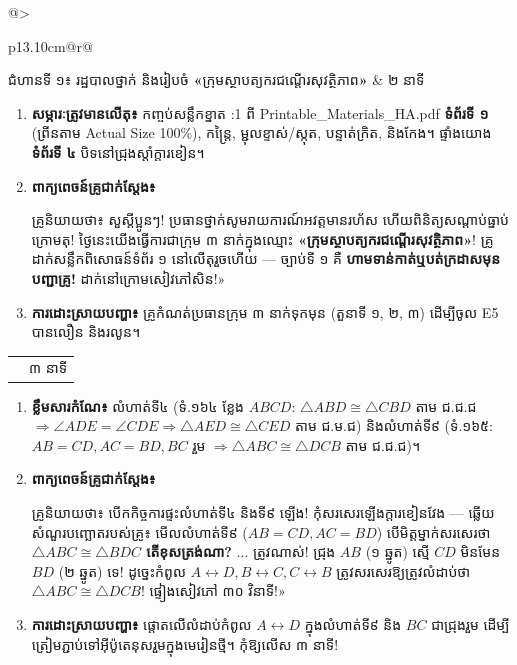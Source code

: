 \documentclass[a4paper,12pt]{article}
\makeatletter
\newcommand{\en}[1]{{\TimesEn #1}}
\newcommand{\enbf}[1]{{\TimesEn\textbf{#1}}}
\newcommand{\tri}[1]{\ensuremath{\triangle #1}}
\newcommand{\ang}[1]{\ensuremath{\angle #1}}
\newcommand{\cg}{\ensuremath{\cong}}
\newenvironment{phasebox}[3]{%
  \par\needspace{2.4cm}%
  \begin{tcolorbox}[
    enhanced, sharp corners, colback=headgray, colframe=black,
    boxrule=1.0pt, top=3.5pt, bottom=3.5pt, left=8pt, right=8pt,
    before skip=5pt, after skip=3pt
  ]
    \linespread{1.0}\selectfont\renewcommand{\arraystretch}{1.0}%
    \begin{tabular*}{\linewidth}{@{}>{\raggedright\arraybackslash}p{13.10cm}@{\extracolsep{\fill}}r@{}}
      {\muol\fontsize{11pt}{14.5pt}\selectfont #1} & {\fontsize{10.5pt}{13.5pt}\selectfont\en{#2 |} #3}%
    \end{tabular*}%
  \end{tcolorbox}%
  \begingroup\fontsize{11.5pt}{14.92pt}\selectfont
}{%
  \par\endgroup
  \vspace{3pt}{\color{black}\hrule height 0.75pt}\vspace{5pt}%
}
\makeatother
\begin{document}
\begin{phasebox}{ជំហានទី ១៖ រដ្ឋបាលថ្នាក់ និងរៀបចំ \enbf{«}ក្រុមស្ថាបត្យករជណ្ដើរសុវត្ថិភាព\enbf{»}}{00--02 min}{២ នាទី}
  \begin{enumerate}[leftmargin=0.45cm, topsep=1.5pt, itemsep=2.2pt, parsep=0pt]
    \item \textbf{សម្ភារៈត្រូវមានលើតុ៖} កញ្ចប់សន្លឹកខ្នាត \en{1:1} ពី \en{Printable\_\allowbreak Materials\_\allowbreak HA.pdf} \textbf{ទំព័រទី ១} (ព្រីនតាម \en{Actual Size 100\%}), កន្ត្រៃ, ម្ជុលខ្ទាស់/ស្កុត, បន្ទាត់ក្រិត, និងកែង។ ផ្ទាំងយោង \textbf{ទំព័រទី ៤} បិទនៅជ្រុងស្ដាំក្ដារខៀន។
    \item \textbf{ពាក្យពេចន៍គ្រូជាក់ស្ដែង៖}
      \begin{scriptbox}
        {\muol\fontsize{10.8pt}{14.5pt}\selectfont \enbf{«}គ្រូនិយាយថា៖} សួស្ដីប្អូនៗ! ប្រធានថ្នាក់សូមរាយការណ៍អវត្តមានរហ័ស ហើយពិនិត្យសណ្ដាប់ធ្នាប់ក្រោមតុ! ថ្ងៃនេះយើងធ្វើការជាក្រុម ៣ នាក់ក្នុងឈ្មោះ \textbf{«ក្រុមស្ថាបត្យករជណ្ដើរសុវត្ថិភាព»}! គ្រូដាក់សន្លឹកពិសោធន៍ទំព័រ ១ នៅលើតុរួចហើយ — ច្បាប់ទី ១ គឺ \textbf{ហាមទាន់កាត់ឬបត់ក្រដាសមុនបញ្ជាគ្រូ!} ដាក់នៅក្រោមសៀវភៅសិន!»
      \end{scriptbox}
    \item \textbf{ការដោះស្រាយបញ្ហា៖} គ្រូកំណត់ប្រធានក្រុម ៣ នាក់ទុកមុន (តួនាទី ១, ២, ៣) ដើម្បីចូល \en{E5} បានលឿន និងរលូន។
  \end{enumerate}
\end{phasebox}

\begin{phasebox}{ជំហានទី ២ \enbf{(}ក\enbf{)}៖ កំណែកិច្ចការផ្ទះមេរៀន \enbf{SSS (\#4, \#9)} \enbf{\&} សំណួរបញ្ឆោត}{02--05 min}{៣ នាទី}
  \begin{enumerate}[leftmargin=0.45cm, topsep=1.5pt, itemsep=2.2pt, parsep=0pt]
    \item \textbf{ខ្លឹមសារកំណែ៖} លំហាត់ទី៤ (ទំ.១៦៤ ខ្លែង $ABCD$: $\tri{ABD}\cg\tri{CBD}$ តាម ជ.ជ.ជ $\Rightarrow \ang{ADE}=\ang{CDE} \Rightarrow \tri{AED}\cg\tri{CED}$ តាម ជ.ម.ជ) និងលំហាត់ទី៩ (ទំ.១៦៥: $AB=CD, AC=BD, BC$ រួម $\Rightarrow \tri{ABC}\cg\tri{DCB}$ តាម ជ.ជ.ជ)។
    \item \textbf{ពាក្យពេចន៍គ្រូជាក់ស្ដែង៖}
      \begin{scriptbox}
        {\muol\fontsize{10.8pt}{14.5pt}\selectfont \enbf{«}គ្រូនិយាយថា៖} បើកកិច្ចការផ្ទះលំហាត់ទី៤ និងទី៩ ឡើង! កុំសរសេរឡើងក្ដារខៀនវែង — ឆ្លើយសំណួរបញ្ឆោតរបស់គ្រូ៖ មើលលំហាត់ទី៩ ($AB=CD, AC=BD$) បើមិត្តម្នាក់សរសេរថា \textbf{$\tri{ABC}\cg\tri{BDC}$ តើខុសត្រង់ណា?} ... ត្រូវណាស់! ជ្រុង $AB$ (១ ឆ្នូត) ស្មើ $CD$ មិនមែន $BD$ (២ ឆ្នូត) ទេ! ដូច្នេះកំពូល $A\leftrightarrow D, B\leftrightarrow C, C\leftrightarrow B$ ត្រូវសរសេរឱ្យត្រូវលំដាប់ថា \textbf{$\tri{ABC}\cg\tri{DCB}$}! ផ្ទៀងសៀវភៅ ៣០ វិនាទី!»
      \end{scriptbox}
    \item \textbf{ការដោះស្រាយបញ្ហា៖} ផ្ដោតលើលំដាប់កំពូល $A\leftrightarrow D$ ក្នុងលំហាត់ទី៩ និង $BC$ ជាជ្រុងរួម ដើម្បីត្រៀមភ្ជាប់ទៅអ៊ីប៉ូតេនុសរួមក្នុងមេរៀនថ្មី។ កុំឱ្យលើស ៣ នាទី!
  \end{enumerate}
\end{phasebox}
\end{document}
